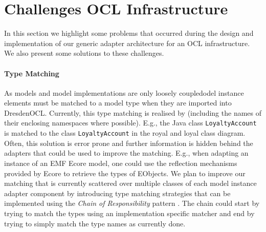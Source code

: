 \section{Challenges  OCL Infrastructure}
\label{sec:lessons}
  In this section we highlight some problems that occurred during the design
  and implementation of our generic adapter architecture for an OCL infrastructure.
  We also present some solutions to these challenges.

	\paragraph{Type Matching}
	As models and model implementations are only loosely 
	coupledodel instance elements must be matched to a model type
	when they are imported into DresdenOCL. Currently, this type matching is realised by  (including the names of 
	their enclosing namespaces where possible). E.g., the Java class \texttt{LoyaltyAccount} is
	matched to the class \texttt{LoyaltyAccount} in the royal and loyal class diagram.
	Often, this solution is error prone  and further information is hidden behind the adapters that could be 
	used to improve the matching. E.g., when adapting an instance of an EMF 
	Ecore model, one could use the reflection mechanisms provided by Ecore to
	retrieve the types of EObjects. We plan to improve our matching
	that is currently scattered over multiple classes of each model instance 
	adapter component by introducing type matching strategies that 
	can be implemented using the \emph{Chain of Responsibility} 
	pattern \cite{gamma:dp}. The chain could start by trying to match the 
	types using an implementation specific matcher and end by trying to 
	simply match the type names as currently done.
	
